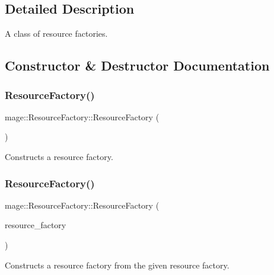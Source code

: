 \subsection{Detailed Description}
A class of resource factories. 

\subsection{Constructor \& Destructor Documentation}
\hypertarget{classmage_1_1_resource_factory_a340bde81096427e319b60063ae771a0d}{}\label{classmage_1_1_resource_factory_a340bde81096427e319b60063ae771a0d} 
\subsubsection{\texorpdfstring{Resource\+Factory()}{ResourceFactory()}\hspace{0.1cm}{\footnotesize\ttfamily [1/3]}}
{\footnotesize\ttfamily mage\+::\+Resource\+Factory\+::\+Resource\+Factory (\begin{DoxyParamCaption}{ }\end{DoxyParamCaption})}

Constructs a resource factory. \hypertarget{classmage_1_1_resource_factory_ac2d236ed7dc16f4ab87d9d8e95d78a94}{}\label{classmage_1_1_resource_factory_ac2d236ed7dc16f4ab87d9d8e95d78a94} 
\subsubsection{\texorpdfstring{Resource\+Factory()}{ResourceFactory()}\hspace{0.1cm}{\footnotesize\ttfamily [2/3]}}
{\footnotesize\ttfamily mage\+::\+Resource\+Factory\+::\+Resource\+Factory (\begin{DoxyParamCaption}\item[{const \hyperlink{classmage_1_1_resource_factory}{Resource\+Factory} \&}]{resource\+\_\+factory }\end{DoxyParamCaption})\hspace{0.3cm}{\ttfamily [delete]}}

Constructs a resource factory from the given resource factory.


